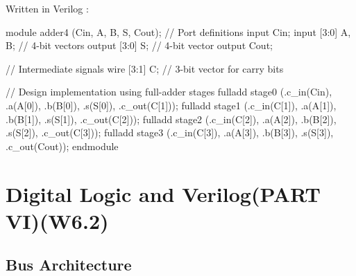 \documentclass[12pt,openany]{book}
\begin{document}
			      	Written in Verilog : 
			      	\begin{vhdl}
module adder4 (Cin, A, B, S, Cout);
// Port definitions
input Cin;
input [3:0] A, B; // 4-bit vectors
output [3:0] S;   // 4-bit vector
output Cout;

// Intermediate signals
wire [3:1] C; // 3-bit vector for carry bits

// Design implementation using full-adder stages
fulladd stage0 (.c_in(Cin), .a(A[0]), .b(B[0]), .s(S[0]), .c_out(C[1]));
fulladd stage1 (.c_in(C[1]), .a(A[1]), .b(B[1]), .s(S[1]), .c_out(C[2]));
fulladd stage2 (.c_in(C[2]), .a(A[2]), .b(B[2]), .s(S[2]), .c_out(C[3]));
fulladd stage3 (.c_in(C[3]), .a(A[3]), .b(B[3]), .s(S[3]), .c_out(Cout));
endmodule
			      	\end{vhdl}
			      	
			      	
					
			      	\chapter{Digital Logic and Verilog(PART VI)(W6.2)}

					\section{Bus Architecture}
\end{document}
